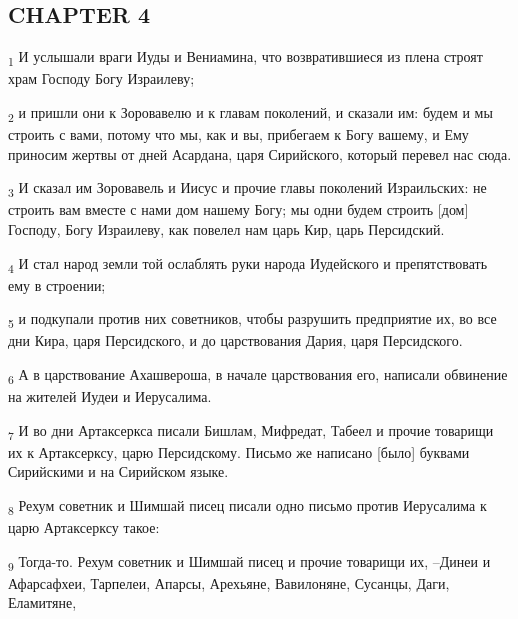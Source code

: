 \subsection{CHAPTER 4}
\begin{tcolorbox}
\textsubscript{1} И услышали враги Иуды и Вениамина, что возвратившиеся из плена строят храм Господу Богу Израилеву;
\end{tcolorbox}
\begin{tcolorbox}
\textsubscript{2} и пришли они к Зоровавелю и к главам поколений, и сказали им: будем и мы строить с вами, потому что мы, как и вы, прибегаем к Богу вашему, и Ему приносим жертвы от дней Асардана, царя Сирийского, который перевел нас сюда.
\end{tcolorbox}
\begin{tcolorbox}
\textsubscript{3} И сказал им Зоровавель и Иисус и прочие главы поколений Израильских: не строить вам вместе с нами дом нашему Богу; мы одни будем строить [дом] Господу, Богу Израилеву, как повелел нам царь Кир, царь Персидский.
\end{tcolorbox}
\begin{tcolorbox}
\textsubscript{4} И стал народ земли той ослаблять руки народа Иудейского и препятствовать ему в строении;
\end{tcolorbox}
\begin{tcolorbox}
\textsubscript{5} и подкупали против них советников, чтобы разрушить предприятие их, во все дни Кира, царя Персидского, и до царствования Дария, царя Персидского.
\end{tcolorbox}
\begin{tcolorbox}
\textsubscript{6} А в царствование Ахашвероша, в начале царствования его, написали обвинение на жителей Иудеи и Иерусалима.
\end{tcolorbox}
\begin{tcolorbox}
\textsubscript{7} И во дни Артаксеркса писали Бишлам, Мифредат, Табеел и прочие товарищи их к Артаксерксу, царю Персидскому. Письмо же написано [было] буквами Сирийскими и на Сирийском языке.
\end{tcolorbox}
\begin{tcolorbox}
\textsubscript{8} Рехум советник и Шимшай писец писали одно письмо против Иерусалима к царю Артаксерксу такое:
\end{tcolorbox}
\begin{tcolorbox}
\textsubscript{9} Тогда-то. Рехум советник и Шимшай писец и прочие товарищи их, --Динеи и Афарсафхеи, Тарпелеи, Апарсы, Арехьяне, Вавилоняне, Сусанцы, Даги, Еламитяне,
\end{tcolorbox}
